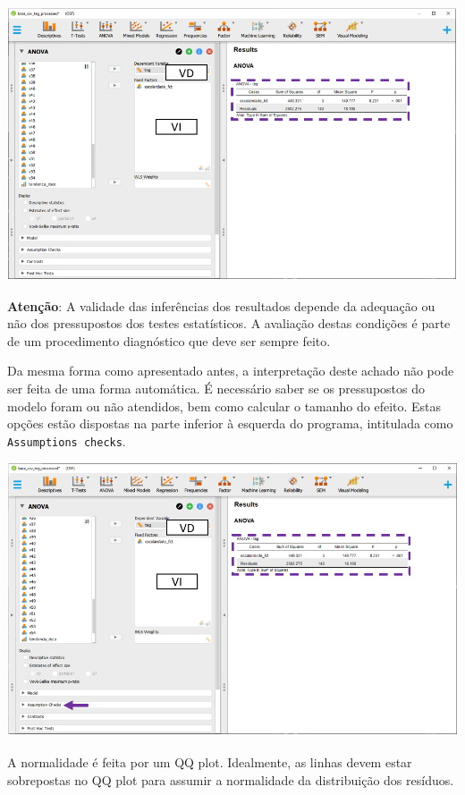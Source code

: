 \documentclass[
]{book}
\begin{document}
\includegraphics{./img/cap_anova_resultados_iniciais.png}

\begin{warning}

\textbf{Atenção}: A validade das inferências dos resultados depende da adequação ou não dos pressupostos dos testes estatísticos. A avaliação destas condições é parte de um procedimento diagnóstico que deve ser sempre feito.

\end{warning}

Da mesma forma como apresentado antes, a interpretação deste achado não pode ser feita de uma forma automática. É necessário saber se os pressupostos do modelo foram ou não atendidos, bem como calcular o tamanho do efeito. Estas opções estão dispostas na parte inferior à esquerda do programa, intitulada como \texttt{Assumptions\ checks}.

\includegraphics{./img/cap_anova_assumptions.png}

A normalidade é feita por um QQ plot. Idealmente, as linhas devem estar sobrepostas no QQ plot para assumir a normalidade da distribuição dos resíduos.
\end{document}
